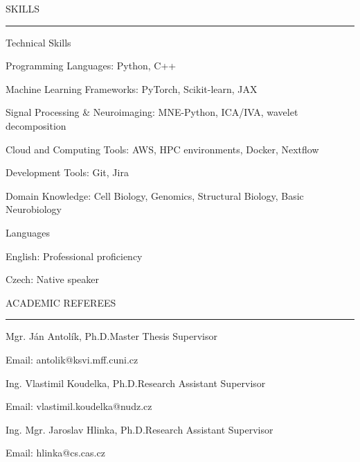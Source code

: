 \documentclass{resume} %
\renewenvironment{rSection}[1]{
\sectionskip
\textcolor{CarnegieMellonRed}{\MakeUppercase{#1}}
\sectionlineskip
\hrule
\begin{list}{}{
\setlength{\leftmargin}{1.5em}
}
\item[]
}{
\end{list}
}
\begin{document}
\begin{rSection}{Skills} \itemsep -2pt

\begin{rProject}{Technical Skills}{}{}{}
    \item Programming Languages: Python, C++
    \item Machine Learning Frameworks: PyTorch, Scikit-learn, JAX
    \item Signal Processing \& Neuroimaging: MNE-Python, ICA/IVA, wavelet decomposition
    \item Cloud and Computing Tools: AWS, HPC environments, Docker, Nextflow
    \item Development Tools: Git, Jira
    \item Domain Knowledge: Cell Biology, Genomics, Structural Biology, Basic Neurobiology
\end{rProject}

\begin{rProject}{Languages}{}{}{}
    \item English: Professional proficiency
    \item Czech: Native speaker
\end{rProject}

\end{rSection}

\begin{rSection}{Academic Referees} \itemsep -2pt
\begin{rProject}{\large Mgr. Ján Antolík, Ph.D.}{Master Thesis Supervisor}{}{}
    \item Email: antolik@ksvi.mff.cuni.cz
\end{rProject}
\begin{rProject}{\large Ing. Vlastimil Koudelka, Ph.D.}{Research Assistant Supervisor}{}{}
    \item Email: vlastimil.koudelka@nudz.cz
\end{rProject}
\begin{rProject}{\large Ing. Mgr. Jaroslav Hlinka, Ph.D.}{Research Assistant Supervisor}{}{}
    \item Email: hlinka@cs.cas.cz
\end{rProject}
\end{rSection}
\end{document}
